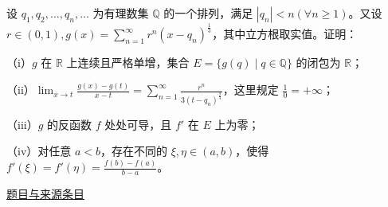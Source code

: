 \documentclass[12pt,fontset=fandol]{ctexart}
\begin{document}
\begin{example}[来源序号7]\label{ex:fin14-high:7}\label{pr:fin14-high:7}

设 $q_1, q_2, \dots, q_n, \dots$ 为有理数集 $\mathbb{Q}$ 的一个排列，满足 $|q_n| < n (\forall n \geq 1)$。又设 $r \in (0, 1), g(x) = \sum_{n=1}^{\infty} r^n (x - q_n)^{\frac{1}{3}}$，其中立方根取实值。证明：

（i）$g$ 在 $\mathbb{R}$ 上连续且严格单增，集合 $E = \{g(q) \mid q \in \mathbb{Q}\}$ 的闭包为 $\mathbb{R}$；

（ii）$\lim_{x \to t} \frac{g(x) - g(t)}{x - t} = \sum_{n=1}^{\infty} \frac{r^n}{3 (t - q_n)^{\frac{2}{3}}}$，这里规定 $\frac{1}{0} = +\infty$；

（iii）$g$ 的反函数 $f$ 处处可导，且 $f'$ 在 $E$ 上为零；

（iv）对任意 $a < b$，存在不同的 $\xi, \eta \in (a, b)$，使得 $f'(\xi) = f'(\eta) = \frac{f(b) - f(a)}{b - a}$。

\par\href{https://github.com/lzxcr/cmc-mathematics/blob/64916fa1fdbc3e444a652eca204d5669058ee321/src/problems/finals/14/07.md}{题目与来源条目}

\end{example}
\end{document}

